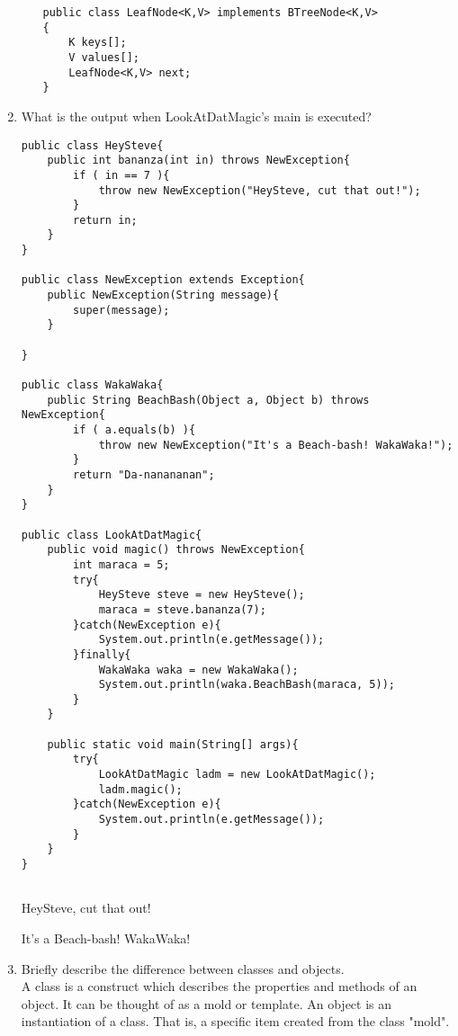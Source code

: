 \documentclass[11pt]{article}
\newenvironment{answer}{\large\lstset{basicstyle=\large}\color{white}}{}
\newenvironment{answer}{\large\lstset{basicstyle=\large}\color{red}}{}
\begin{document}
\begin{enumerate}
\begin{enumerate}
\begin{answer}
\begin{lstlisting}
public class LeafNode<K,V> implements BTreeNode<K,V>
{
    K keys[];
    V values[];
    LeafNode<K,V> next;
}
\end{lstlisting}
\end{answer}

    \end{enumerate}

\item What is the output when LookAtDatMagic's main is executed?
\begin{lstlisting}
public class HeySteve{
    public int bananza(int in) throws NewException{
        if ( in == 7 ){
            throw new NewException("HeySteve, cut that out!");
        }
        return in;
    }
}

public class NewException extends Exception{
    public NewException(String message){
        super(message);
    }

}
           
public class WakaWaka{
    public String BeachBash(Object a, Object b) throws NewException{
        if ( a.equals(b) ){
            throw new NewException("It's a Beach-bash! WakaWaka!");
        }
        return "Da-nanananan";
    }
}

public class LookAtDatMagic{
    public void magic() throws NewException{
        int maraca = 5;
        try{
            HeySteve steve = new HeySteve();
            maraca = steve.bananza(7);
        }catch(NewException e){
            System.out.println(e.getMessage());
        }finally{
            WakaWaka waka = new WakaWaka();
            System.out.println(waka.BeachBash(maraca, 5));
        }
    }

    public static void main(String[] args){
        try{
            LookAtDatMagic ladm = new LookAtDatMagic();
            ladm.magic();
        }catch(NewException e){
            System.out.println(e.getMessage());
        }
    }
}


\end{lstlisting}
\begin{answer}
HeySteve, cut that out!


It's a Beach-bash! WakaWaka!
\end{answer}

\item Briefly describe the difference between classes and objects.\\
\begin{answer}
    A class is a construct which describes the properties and methods of an object. It can be thought of as a mold or template. An object is an 
instantiation of a class. That is, a specific item created from the class "mold".
\end{answer}


\end{enumerate}
\end{document}
